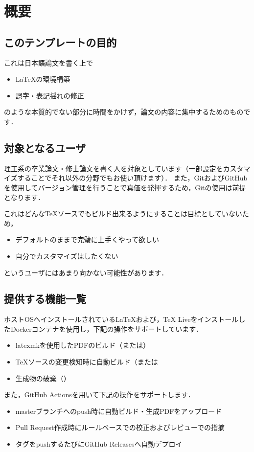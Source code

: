 \documentclass[main]{subfiles}
\begin{document}
\section{概要}

\subsection{このテンプレートの目的}

これは日本語論文を書く上で

\begin{itemize}
    \item LaTeXの環境構築
    \item 誤字・表記揺れの修正
\end{itemize}

のような本質的でない部分に時間をかけず，論文の内容に集中するためのものです．

\subsection{対象となるユーザ}
理工系の卒業論文・修士論文を書く人を対象としています（一部設定をカスタマイズすることでそれ以外の分野でもお使い頂けます）．
また，GitおよびGitHubを使用してバージョン管理を行うことで真価を発揮するため，Gitの使用は前提となります．


これはどんなTeXソースでもビルド出来るようにすることは目標としていないため，

\begin{itemize}
    \item デフォルトのままで完璧に上手くやって欲しい
    \item 自分でカスタマイズはしたくない
\end{itemize}

というユーザにはあまり向かない可能性があります．

\subsection{提供する機能一覧}

ホストOSへインストールされているLaTeXおよび，TeX LiveをインストールしたDockerコンテナを使用し，下記の操作をサポートしています．

\begin{itemize}
    \item latexmkを使用したPDFのビルド（または）
    \item TeXソースの変更検知時に自動ビルド（または
    \item 生成物の破棄（）
\end{itemize}

また，GitHub Actionsを用いて下記の操作をサポートします．

\begin{itemize}
    \item masterブランチへのpush時に自動ビルド・生成PDFをアップロード
    \item Pull Request作成時にルールベースでの校正およびレビューでの指摘
    \item タグをpushするたびにGitHub Releasesへ自動デプロイ
\end{itemize}
\end{document}
